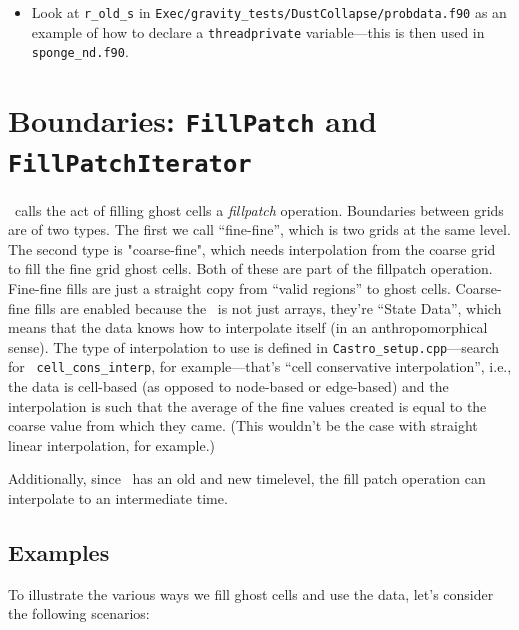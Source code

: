 \begin{itemize}
\begin{itemize}
\item Look at {\tt r\_old\_s} in {\tt Exec/gravity\_tests/DustCollapse/probdata.f90} as an
  example of how to declare a {\tt threadprivate} variable---this is then used
  in {\tt sponge\_nd.f90}.

\end{itemize}

\end{itemize}



\section{Boundaries: {\tt FillPatch} and {\tt FillPatchIterator}}

\boxlib\ calls the act of filling ghost cells a {\em fillpatch}
operation.  Boundaries between grids are of two types. The first we
call ``fine-fine'', which is two grids at the same level.  The second
type is "coarse-fine", which needs interpolation from the coarse grid
to fill the fine grid ghost cells.  Both of these are part of the
fillpatch operation.  Fine-fine fills are just a straight copy from
``valid regions'' to ghost cells.  Coarse-fine fills are enabled
because the \statedata\ is not just arrays, they're ``State Data'',
which means that the data knows how to interpolate itself (in an
anthropomorphical sense).  The type of interpolation to use is defined
in {\tt Castro\_setup.cpp}---search for {\tt
  cell\_cons\_interp}, for example---that's ``cell conservative
interpolation'', i.e., the data is cell-based (as opposed to
node-based or edge-based) and the interpolation is such that the
average of the fine values created is equal to the coarse value from
which they came.  (This wouldn't be the case with straight linear
interpolation, for example.)

Additionally, since \statedata\ has an old and new timelevel, 
the fill patch operation can interpolate to an intermediate time.

\subsection{Examples}

To illustrate the various ways we fill ghost cells and use the data,
let's consider the following scenarios:


